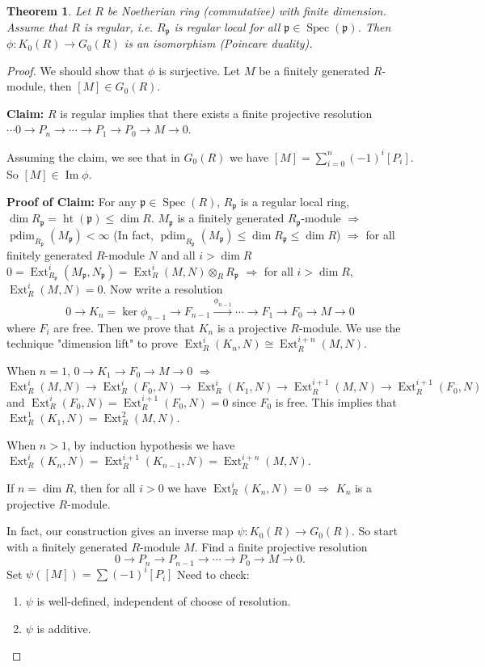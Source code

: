 \documentclass[cs4size]{article}
\newcommand{\frp}{\mathfrak{p}}
\newcommand{\ra}{\rightarrow}
\newcommand{\xr}{\xrightarrow}
\newcommand{\Ra}{\Rightarrow}
\DeclareMathOperator{\Ext}{Ext}
\DeclareMathOperator{\Image}{Im}
\DeclareMathOperator{\Spec}{Spec}
\DeclareMathOperator{\height}{ht}
\DeclareMathOperator{\pdim}{pdim}
\newtheorem{thm}{Theorem}
\begin{document}
\begin{thm}
Let $R$ be Noetherian ring (commutative) with finite dimension. Assume that $R$ is regular, i.e. $R_\frp$ is regular local for all $\frp\in\Spec(\frp)$. Then $\phi: K_0(R)\ra G_0(R)$ is an isomorphism (Poincare duality).
\end{thm}
\begin{proof}
We should show that $\phi$ is surjective. Let $M$ be a finitely generated $R$-module, then $[M]\in G_0(R)$.

\textbf{Claim:} $R$ is regular implies that there exists a finite projective resolution $\cdots0\ra P_n\ra \cdots\ra P_1\ra P_0\ra M\ra 0$.

Assuming the claim, we see that in $G_0(R)$ we have $[M]=\sum_{i=0}^n(-1)^i[P_i]$. So $[M]\in\Image\phi$.

\textbf{Proof of Claim:} For any $\frp\in \Spec (R)$, $R_\frp$ is a regular local ring, $\dim R_\frp=\height (\frp)\leq \dim R$. $M_\frp$ is a finitely generated $R_\frp$-module $\Ra$ $\pdim_{R_\frp}(M_\frp)<\infty$ (In fact, $\pdim_{R_\frp}(M_\frp)\leq\dim R_\frp\leq \dim R$) $\Ra$ for all finitely generated $R$-module $N$ and all $i>\dim R$ $0=\Ext_{R_\frp}^i(M_\frp,N_\frp)=\Ext_R^i(M,N)\otimes_RR_\frp$ $\Ra$ for all $i>\dim R$, $\Ext_R^i(M,N)=0$. Now write a resolution
\[0\ra K_n=\ker \phi_{n-1}\ra F_{n-1}\xr{\phi_{n-1}}\cdots\ra F_1\ra F_0\ra M\ra 0\]
where $F_i$ are free. Then we prove that $K_n$ is a projective $R$-module. We use the technique "dimension lift" to prove $\Ext_R^i(K_n,N)\cong \Ext_R^{i+n}(M,N)$.

When $n=1$, $0\ra K_1\ra F_0\ra M\ra 0$ $\Ra$ $\Ext_R^i(M,N)\ra \Ext_R^i(F_0,N)\ra \Ext_R^i(K_1,N)\ra \Ext_R^{i+1}(M,N)\ra \Ext_R^{i+1}(F_0,N)$
and $\Ext_R^i(F_0,N)=\Ext_R^{i+1}(F_0,N)=0$ since $F_0$ is free. This implies that $\Ext_R^1(K_1,N)=\Ext_R^2(M,N)$.

When $n>1$, by induction hypothesis we have $\Ext_R^i(K_n,N)=\Ext_R^{i+1}(K_{n-1},N)=\Ext_R^{i+n}(M,N)$.

If $n=\dim R$, then for all $i>0$ we have $\Ext_R^i(K_n,N)=0$ $\Ra$ $K_n$ is a projective $R$-module.

In fact, our construction gives an inverse map $\psi: K_0(R)\ra G_0(R).$ So start with a finitely generated $R$-module $M$. Find a finite projective resolution \[0\ra P_n\ra P_{n-1}\ra \cdots\ra P_0\ra M\ra0.\] Set $\psi([M])=\sum(-1)^i[P_i]$ Need to check:
\begin{enumerate}
\item $\psi$ is well-defined, independent of choose of resolution.
\item $\psi$ is additive.
\end{enumerate}
\end{proof}
\end{document}

